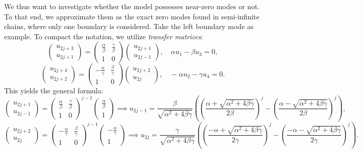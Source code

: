 \documentclass{article}
\begin{document}
We thus want to investigate whether the model possesses near-zero modes or not.
To that end, we approximate them as the exact zero modes found in semi-infinite chains,
where only one boundary is considered.
Take the left boundary mode as example.
To compact the notation, we utilize \emph{transfer matrices}:
\[
    \begin{pmatrix}
        u_{2j+3} \\ u_{2j+1}
    \end{pmatrix} = \begin{pmatrix}
        \frac{\alpha}{\beta} & \frac{\gamma}{\beta} \\ 1 & 0
    \end{pmatrix} \begin{pmatrix}
        u_{2j+1} \\ u_{2j-1}
    \end{pmatrix},\quad
    \alpha u_1 - \beta u_3 = 0,
\]
\[
    \begin{pmatrix}
        u_{2j+4} \\ u_{2j+2}
    \end{pmatrix} = \begin{pmatrix}
        -\frac{\alpha}{\gamma} & \frac{\beta}{\gamma} \\ 1 & 0
    \end{pmatrix} \begin{pmatrix}
        u_{2j+2} \\ u_{2j}
    \end{pmatrix},\quad
    -\alpha u_2 - \gamma u_4 = 0.
\]
This yields the general formula:
\[
    \begin{pmatrix}
        u_{2j+1} \\ u_{2j-1}
    \end{pmatrix} = \begin{pmatrix}
        \frac{\alpha}{\beta} & \frac{\gamma}{\beta} \\ 1 & 0
    \end{pmatrix}^{j-1} \begin{pmatrix}
        \frac{\alpha}{\beta} \\ 1
    \end{pmatrix}
    \implies
    u_{2j-1} = \frac{\beta}{\sqrt{\alpha^2 + 4\beta\gamma}}\left(
        \left(\frac{\alpha+\sqrt{\alpha^2+4\beta\gamma}}{2\beta}\right)^j
        - \left(\frac{\alpha-\sqrt{\alpha^2+4\beta\gamma}}{2\beta}\right)^j
    \right),
\]
\[
    \begin{pmatrix}
        u_{2j+2} \\ u_{2j}
    \end{pmatrix} = \begin{pmatrix}
        -\frac{\alpha}{\gamma} & \frac{\beta}{\gamma} \\ 1 & 0
    \end{pmatrix}^{j-1} \begin{pmatrix}
        -\frac{\alpha}{\gamma} \\ 1
    \end{pmatrix}
    \implies
    u_{2j} = \frac{\gamma}{\sqrt{\alpha^2+4\beta\gamma}} \left(
        \left(\frac{-\alpha+\sqrt{\alpha^2+4\beta\gamma}}{2\gamma}\right)^j
        - \left(\frac{-\alpha-\sqrt{\alpha^2+4\beta\gamma}}{2\gamma}\right)^j
    \right).
\]
\end{document}
